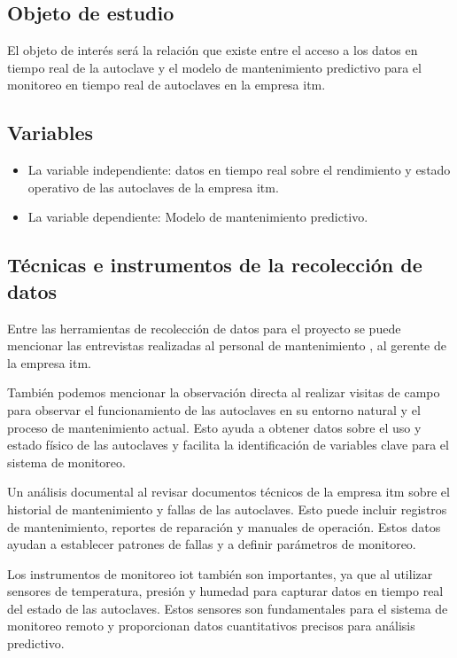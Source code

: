 \subsection{Objeto de estudio}
El objeto de interés será la relación que existe entre el acceso a los datos en tiempo real de la autoclave y el modelo de mantenimiento predictivo para el monitoreo en tiempo real de autoclaves en la empresa \acrshort{itm}. 

\subsection{Variables}
\begin{itemize}
    \item La variable independiente: datos en tiempo real sobre el rendimiento y estado operativo de las autoclaves de la empresa \acrshort{itm}.
   
    
    \item La variable dependiente: Modelo de mantenimiento predictivo.
    
\end{itemize}

\subsection{Técnicas e instrumentos de la recolección de datos}
Entre las herramientas de recolección de datos para el proyecto se puede mencionar las entrevistas realizadas al personal de mantenimiento , al gerente de la empresa \acrshort{itm}.

También podemos mencionar la observación directa al realizar visitas de campo para observar el funcionamiento de las autoclaves en su entorno natural y el proceso de mantenimiento actual. Esto ayuda a obtener datos sobre el uso y estado físico de las autoclaves y facilita la identificación de variables clave para el sistema de monitoreo.

Un análisis documental al revisar documentos técnicos de la empresa \acrshort{itm} sobre el historial de mantenimiento y fallas de las autoclaves. Esto puede incluir registros de mantenimiento, reportes de reparación y manuales de operación. Estos datos ayudan a establecer patrones de fallas y a definir parámetros de monitoreo.

Los instrumentos de monitoreo \acrshort{iot} también son importantes, ya que al utilizar sensores de temperatura, presión y humedad para capturar datos en tiempo real del estado de las autoclaves. Estos sensores son fundamentales para el sistema de monitoreo remoto y proporcionan datos cuantitativos precisos para análisis predictivo.


